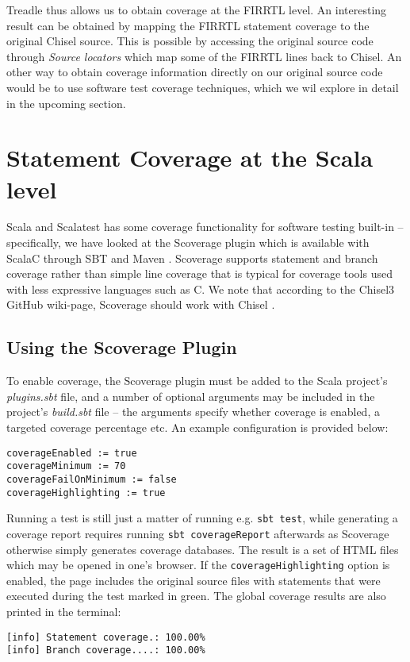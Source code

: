 \documentclass[conference]{IEEEtran}
\begin{document}
Treadle thus allows us to obtain coverage at the FIRRTL level. An interesting result can be obtained by mapping the FIRRTL statement coverage to the original Chisel source. This is possible by accessing the original source code through \textit{Source locators} which map some of the FIRRTL lines back to Chisel. An other way to obtain coverage information directly on our original source code would be to use software test coverage techniques, which we wil explore in detail in the upcoming section.

\section{Statement Coverage at the Scala level}
Scala and Scalatest has some coverage functionality for software testing built-in -- specifically, we have looked at the Scoverage plugin which is available with ScalaC through SBT and Maven \cite{scoverage}. Scoverage supports statement and branch coverage rather than simple line coverage that is typical for coverage tools used with less expressive languages such as C. We note that according to the Chisel3 GitHub wiki-page, Scoverage should work with Chisel \cite{chisel:scoverage}.

\subsection{Using the Scoverage Plugin}
To enable coverage, the Scoverage plugin must be added to the Scala project's \textit{plugins.sbt} file, and a number of optional arguments may be included in the project's \textit{build.sbt} file -- the arguments specify whether coverage is enabled, a targeted coverage percentage etc. An example configuration is provided below:
\begin{verbatim}
coverageEnabled := true
coverageMinimum := 70
coverageFailOnMinimum := false
coverageHighlighting := true
\end{verbatim}
Running a test is still just a matter of running e.g. \texttt{sbt test}, while generating a coverage report requires running \texttt{sbt coverageReport} afterwards as Scoverage otherwise simply generates coverage databases. The result is a set of HTML files which may be opened in one's browser. If the \texttt{coverageHighlighting} option is enabled, the page includes the original source files with statements that were executed during the test marked in green. The global coverage results are also printed in the terminal:
\begin{verbatim}
[info] Statement coverage.: 100.00%
[info] Branch coverage....: 100.00%
\end{verbatim}
\end{document}
